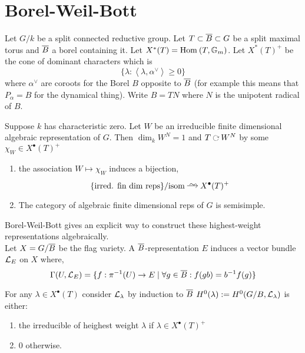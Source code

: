 \documentclass[12pt]{article}
\begin{document}
\newcommand{\inner}[2]{\left< #1, #2 \right>}

\section{Borel-Weil-Bott}

Let $G/k$ be a split connected reductive group. Let $T \subset \overline{B} \subset G$ be a split maximal torus and $\overline{B}$ a borel containing it. Let $X^*(T) = \mathrm{Hom}_{} \left( T, \mathbb{G}_m \right)$. Let $X^*(T)^+$ be the cone of dominant characters which is
\[ \{ \lambda : \inner{\lambda}{\alpha^\vee} \ge 0 \} \]
where $\alpha^\vee$ are coroots for the Borel $B$ opposite to $\overline{B}$ (for example this means that $P_\alpha = B$ for the dynamical thing). Write $B = TN$ where $N$ is the unipotent radical of $B$.

\begin{theorem}
Suppose $k$ has characteristic zero. Let $W$ be an irreducible finite dimensional algebraic representation of $G$. Then $\dim_{k} W^N = 1$ and $T \acts W^N$ by some $\chi_W \in X^\bullet(T)^+$
\begin{enumerate}
\item the association $W \mapsto \chi_W$ induces a bijection,
\[ \{ \text{irred. fin dim reps} \} / \text{isom} \iso X^\bullet(T)^+ \]
\item The category of algebraic finite dimensional reps of $G$ is semisimple. 
\end{enumerate} 
\end{theorem}

Borel-Weil-Bott gives an explicit way to construct these highest-weight representations algebraically.
\bigskip\\
Let $X = G / \overline{B}$ be the flag variety. A $\overline{B}$-representation $E$ induces a vector bundle $\mathcal{L}_E$ on $X$ where,
\[ \Gamma(U, \mathcal{L}_E) = \{ f : \pi^{-1}(U) \to E \mid \forall g \in \overline{B} : f(gb) = b^{-1} f(g) \} \]

\begin{theorem}
For any $\lambda \in X^\bullet(T)$ consider $\mathcal{L}_{\lambda}$ by induction to $\overline{B}$
$H^0(\lambda) := H^0(G/B, \mathcal{L}_\lambda)$ is either:
\begin{enumerate}
\item the irreducible of heighest weight $\lambda$ if $\lambda \in X^\bullet(T)^+$
\item $0$ otherwise.
\end{enumerate}
\end{theorem}
\end{document}
